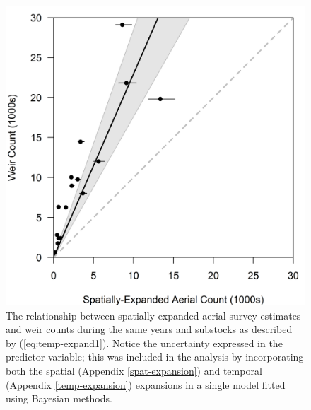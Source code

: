 \documentclass[12pt,]{book}
\theoremstyle{definition}
\theoremstyle{definition}
\theoremstyle{definition}
\theoremstyle{remark}
\begin{document}
\begin{figure}
  \centering
  \includegraphics{img/Ch4/obs-correct.png}
  \caption{The relationship between spatially expanded aerial survey estimates and weir counts during the same years and substocks as described by (\ref{eq:temp-expand1}). Notice the uncertainty expressed in the predictor variable; this was included in the analysis by incorporating both the spatial (Appendix \ref{spat-expansion}) and temporal (Appendix \ref{temp-expansion}) expansions in a single model fitted using Bayesian methods.}
  \label{fig:obs-correct}
\end{figure}

\clearpage
\end{document}
